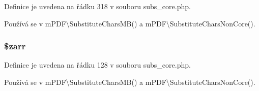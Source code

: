 Definice je uvedena na řádku 318 v souboru subs\-\_\-core.\-php.



Používá se v m\-P\-D\-F\textbackslash{}\-Substitute\-Chars\-M\-B() a m\-P\-D\-F\textbackslash{}\-Substitute\-Chars\-Non\-Core().

\hypertarget{subs__core_8php_a3001ad6d714caa939671f2954a40c018}{
\subsubsection[{\$zarr}]{\setlength{\rightskip}{0pt plus 5cm}\$zarr}}\label{subs__core_8php_a3001ad6d714caa939671f2954a40c018}


Definice je uvedena na řádku 128 v souboru subs\-\_\-core.\-php.



Používá se v m\-P\-D\-F\textbackslash{}\-Substitute\-Chars\-M\-B() a m\-P\-D\-F\textbackslash{}\-Substitute\-Chars\-Non\-Core().

